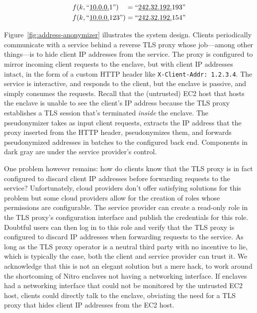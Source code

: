 \begin{align}
f(k, \textrm{``\underline{10.0.0.}1''})\phantom{23} = \textrm{``\underline{242.32.192.}193''} \\
f(k, \textrm{``\underline{10.0.0.}123''}) = \textrm{``\underline{242.32.192.}154''}
\end{align}

Figure~\ref{fig:address-anonymizer} illustrates the system design.  Clients
periodically communicate with a service behind a reverse TLS proxy whose
job---among other things---is to hide client IP addresses from the service.  The
proxy is configured to mirror incoming client requests to the enclave, but with
client IP addresses intact, in the form of a custom HTTP header like
\texttt{X-Client-Addr: 1.2.3.4}.  The service is interactive, and responds to
the client, but the enclave is passive, and simply consumes the requests.
Recall that the (untrusted) EC2 host that hosts the enclave is unable to see
the client's IP address because the TLS proxy establishes a TLS session that's
terminated \emph{inside} the enclave.  The pseudonymizer takes as input client
requests, extracts the IP address that the proxy inserted from the HTTP header,
pseudonymizes them, and forwards pseudonymized addresses in batches to the
configured back end.  Components in dark gray are under the service provider's
control.


One problem however remains: how do clients know that the TLS proxy is in fact
configured to discard client IP addresses before forwarding requests to the
service?  Unfortunately, cloud providers don't offer satisfying solutions for
this problem but some cloud providers allow for the creation of roles whose
permissions are configurable.  The service provider can create a read-only role
in the TLS proxy's configuration interface and publish the credentials for this
role.  Doubtful users can then log in to this role and verify that the TLS proxy
is configured to discard IP addresses when forwarding requests to the service.
As long as the TLS proxy operator is a neutral third party with no incentive to
lie, which is typically the case, both the client and service provider can trust
it.  We acknowledge that this is not an elegant solution but a mere hack, to
work around the shortcoming of Nitro enclaves not having a networking interface.
If enclaves had a networking interface that could not be monitored by the
untrusted EC2 host, clients could directly talk to the enclave, obviating the
need for a TLS proxy that hides client IP addresses from the EC2 host.

